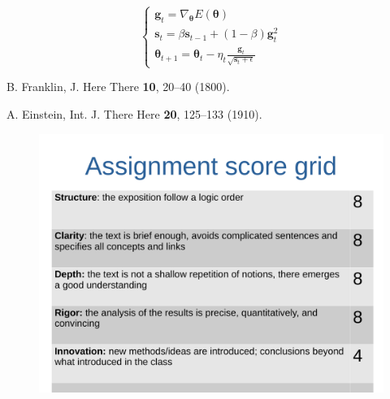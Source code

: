 \documentclass[prl,twocolumn]{revtex4-1}
\numberwithin{equation}{section}
\begin{document}
\begin{equation}
	\begin{cases}
		\boldsymbol{g}_t=\nabla_{\boldsymbol{\theta}}{E(\boldsymbol{\theta})} \\
		\boldsymbol{s}_t=\beta{\boldsymbol{s}_{t-1}}+(1-\beta)\boldsymbol{g}_t^2 \\
		\boldsymbol{\theta}_{t+1}=\boldsymbol{\theta}_t-\eta_t\frac{\boldsymbol{g}_t}{\sqrt{\boldsymbol{s}_t+\epsilon}}
	\end{cases}
\label{eq:rmsprop}
\end{equation}


\begin{thebibliography}{99}

  B. Franklin,
  J. Here There {\bf 10}, 20--40 (1800).
  
  A. Einstein,
  Int. J. There Here {\bf 20}, 125--133 (1910).
  
\end{thebibliography}

\clearpage

\begin{figure}[!tb]
  \centering
  \includegraphics[width=\textwidth]{description_assignment_LCPB_20-21.pdf}
\end{figure}
\end{document}
